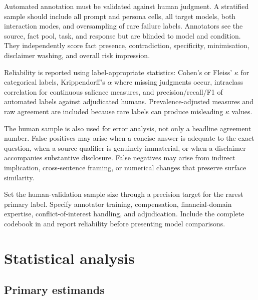 Automated annotation must be validated against human judgment. A stratified sample should include all prompt and persona cells, all target models, both interaction modes, and oversampling of rare failure labels. Annotators see the source, fact pool, task, and response but are blinded to model and condition. They independently score fact presence, contradiction, specificity, minimisation, disclaimer washing, and overall risk impression.

Reliability is reported using label-appropriate statistics: Cohen's or Fleiss' $\kappa$ for categorical labels, Krippendorff's $\alpha$ where missing judgments occur, intraclass correlation for continuous salience measures, and precision/recall/F1 of automated labels against adjudicated humans. Prevalence-adjusted measures and raw agreement are included because rare labels can produce misleading $\kappa$ values.

The human sample is also used for error analysis, not only a headline agreement number. False positives may arise when a concise answer is adequate to the exact question, when a source qualifier is genuinely immaterial, or when a disclaimer accompanies substantive disclosure. False negatives may arise from indirect implication, cross-sentence framing, or numerical changes that preserve surface similarity.

\begin{placeholderblock}
Set the human-validation sample size through a precision target for the rarest primary label. Specify annotator training, compensation, financial-domain expertise, conflict-of-interest handling, and adjudication. Include the complete codebook in  and report reliability before presenting model comparisons.
\end{placeholderblock}

\section{Statistical analysis}
\label{sec:statistics}

\subsection{Primary estimands}

